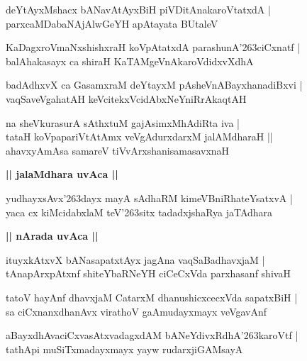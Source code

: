\documentclass[twoside,12pt,openright]{book}
\def\S{\char'263}
\newcounter{shloka}[chapter]
\def\uvaca#1{\centerline{{\large\textbf{#1}}}}
\begin{document}
\begin{shloka}%
deYtAyxMshacx bANavAtAyxBiH piVDitAnakaroVtatxdA |\\
parxcaMDabaNAjAlwGeYH apAtayata BUtaleV
\end{shloka}

\begin{shloka}%
KaDagxroVmaNxshishxraH koVpAtatxdA parashunA\S ciCxnatf |\\
balAhakasayx ca shiraH KaTAMgeVnAkaroVdidxvXdhA
\end{shloka}

\begin{shloka}%
badAdhxvX ca GasamxraM deYtayxM pAsheVnABayxhanadiBxvi |\\
vaqSaveVgahatAH keVcitekxVcidAbxNeYniRrAkaqtAH 
\end{shloka}

\begin{shloka}%
na sheVkurasurA sAthxtuM gajAsimxMhAdiRta iva |\\
tataH koVpapariVtAtAmx veVgAdurxdarxM jalAMdharaH ||\\
ahavxyAmAsa samareV tiVvArxshanisamasavxnaH 
\end{shloka}

\uvaca{|| jalaMdhara uvAca ||}

\begin{shloka}%
yudhayxsAvx\S dayx mayA sAdhaRM kimeVBniRhateYsatxvA |\\
yaca cx kiMcidabxlaM teV\S sitx tadadxjshaRya jaTAdhara
\end{shloka}

\uvaca{|| nArada uvAca ||}

\begin{shloka}%
ituyxkAtxvX bANasapatxtAyx jagAna vaqSaBadhavxjaM |\\
tAnapArxpAtxnf shiteYbaRNeYH ciCeCxVda parxhasanf shivaH 
\end{shloka}

\begin{shloka}%
tatoV hayAnf dhavxjaM CatarxM dhanushicxcecxVda sapatxBiH |\\
sa ciCxnanxdhanAvx virathoV gaAmudayxmayx veVgavAnf 
\end{shloka}

\begin{shloka}%
aBayxdhAvaciCxvasAtxvadagxdAM bANeYdivxRdhA\S karoVtf |\\
tathApi muSiTxmadayxmayx yayw rudarxjiGAMsayA 
\end{shloka}
\end{document}
